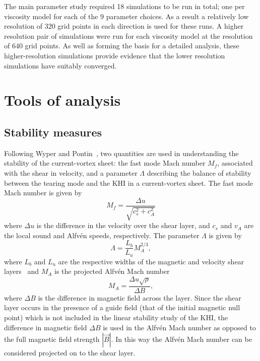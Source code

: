 The main parameter study required 18 simulations to be run in total; one per viscosity model for each of the 9 parameter choices. As a result a relatively low resolution of $320$ grid points in each direction is used for these runs. A higher resolution pair of simulations were run for each viscosity model at the resolution of $640$ grid points. As well as forming the basis for a detailed analysis, these higher-resolution simulations provide evidence that the lower resolution simulations have suitably converged.

\section{Tools of analysis}

\label{sec:khi_analysis}

\subsection{Stability measures}

\label{sec:stability_measures}

Following Wyper and Pontin~\cite{wyperKelvinHelmholtzInstabilityCurrentvortex2013}, two quantities are used in understanding the stability of the current-vortex sheet: the fast mode Mach number $M_f$, associated with the shear in velocity, and a parameter $\Lambda$ describing the balance of stability between the tearing mode and the KHI in a current-vortex sheet. The fast mode Mach number is given by
\begin{equation}
  \label{eq:mach_numbers}
  M_f = \frac{\Delta u}{\sqrt{c_s^2 + c_A^2}}
\end{equation}
where $\Delta u$ is the difference in the velocity over the shear layer, and $c_s$ and $v_A$ are the local sound and Alfv\'en speeds, respectively. The parameter $\Lambda$ is given by
\begin{equation}
  \label{eq:khi_stability_param}
  \Lambda = \frac{L_b}{L_u} M_A^{2/3},
\end{equation}
where $L_b$ and $L_u$ are the respective widths of the magnetic and velocity shear layers~\cite{einaudiResistiveInstabilitiesFlowing1986} and $M_A$ is the projected Alfv\'en Mach number
\begin{equation}
  \label{eq:alfven_mach_number}
M_A = \frac{\Delta u \sqrt{\rho}}{\Delta B},
\end{equation}
where $\Delta B$ is the difference in magnetic field across the layer. Since the shear layer occurs in the presence of a guide field (that of the initial magnetic null point) which is not included in the linear stability study of the KHI, the difference in magnetic field $\Delta B$ is used in the Alfv\'en Mach number as opposed to the full magnetic field strength $|\vec{B}|$. In this way the Alfv\'en Mach number can be considered projected on to the shear layer. 

